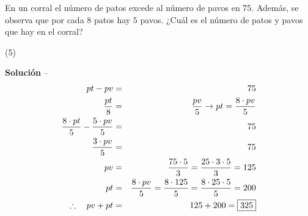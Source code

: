 \item{En un corral el número de patos excede al número de pavos en $75$. Además, se observa que por cada $8$ patos hay $5$ pavos. ¿Cuál es el número de patos y pavos que hay en el corral? 
\begin{tasks}(5)
\end{tasks}
\noindent \textbf{Solución} -- 
\begin{eqnarray*}
pt - pv &=& 75 \\
\dfrac{pt}{8} &=& \dfrac{pv}{5 } \to pt = \dfrac{8 \cdot pv}{5} \\ 
\dfrac{8 \cdot pt}{5} - \dfrac{5 \cdot pv}{5} &=& 75 \\ 
\dfrac{3 \cdot pv}{5} &=& 75 \\ 
pv &=& \dfrac{75 \cdot 5}{3} = \dfrac{25 \cdot 3 \cdot 5}{3} = 125 \\ 
pt &=& \dfrac{8 \cdot pv}{5} = \dfrac{8 \cdot 125}{5} = \dfrac{8 \cdot 25 \cdot 5}{5} = 200 \\
\therefore\quad pv + pt &=& 125 + 200 = \fbox{325}
\end{eqnarray*}
}
